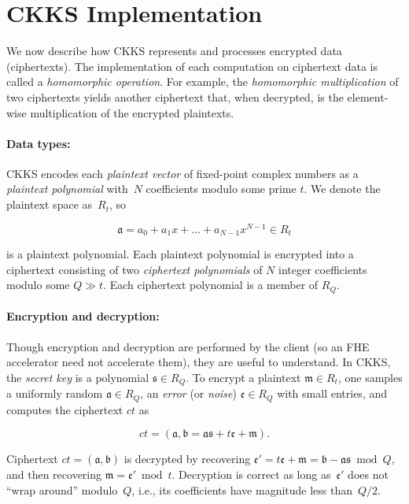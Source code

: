 \section{CKKS Implementation}
\label{sec:fhe_operation}

We now describe how CKKS represents and processes encrypted data (ciphertexts).
The implementation of each computation on ciphertext data is called a
\emph{homomorphic operation}. For example, the \emph{homomorphic
multiplication} of two ciphertexts yields another ciphertext that, when
decrypted, is the element-wise multiplication of the encrypted plaintexts.

\paragraph{Data types:}
CKKS encodes each \emph{plaintext vector} of fixed-point complex numbers as a
\emph{plaintext polynomial} with~$N$ coefficients modulo some prime $t$.
We denote the plaintext space as~$R_t$, so

\[\mathfrak{a} = a_0 + a_1x + ... + a_{N-1}x^{N-1} \in R_t\]

is a plaintext polynomial. Each plaintext polynomial is encrypted into a ciphertext
consisting of two \emph{ciphertext polynomials} of $N$ integer coefficients modulo some $Q \gg
t$. Each ciphertext polynomial is a member of $R_Q$.

\paragraph{Encryption and decryption:}
Though encryption and decryption are performed by the client (so an FHE
accelerator need not accelerate them), they are useful to understand. In CKKS,
the \textit{secret key} is a polynomial $\mathfrak{s} \in R_Q$. To encrypt a
plaintext $\mathfrak{m} \in R_t$, one samples a uniformly random $\mathfrak{a}
\in R_Q$, an \emph{error} (or \emph{noise}) $\mathfrak{e} \in R_Q$ with small
entries, and computes the ciphertext $ct$ as

\begin{equation*}
  ct = (\mathfrak{a}, \mathfrak{b} = \mathfrak{a}\mathfrak{s} + t \mathfrak{e} + \mathfrak{m}).
\end{equation*}

Ciphertext $ct = (\mathfrak{a}, \mathfrak{b})$ is decrypted by recovering
$\mathfrak{e}' = t\mathfrak{e} + \mathfrak{m} = \mathfrak{b} - \mathfrak{a}
\mathfrak{s} \bmod{Q}$, and then recovering $\mathfrak{m} = \mathfrak{e}' \bmod
t$.  Decryption is correct as long as~$\mathfrak{e}'$ does not ``wrap around''
modulo~$Q$, i.e., its coefficients have magnitude less than~$Q/2$.


